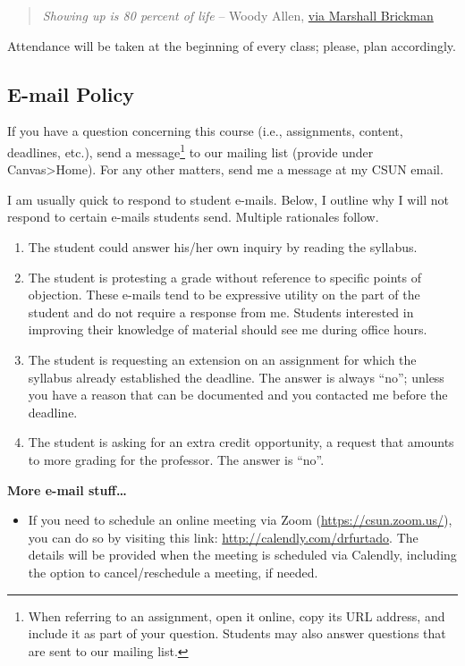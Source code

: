 \documentclass[11pt,]{article}
\providecommand{\tightlist}{%
  \setlength{\itemsep}{0pt}\setlength{\parskip}{0pt}}
\begin{document}
\begin{quote}
\emph{Showing up is 80 percent of life} -- Woody Allen,
\href{http://quoteinvestigator.com/2013/06/10/showing-up/\#note-6553-1}{via
Marshall Brickman}
\end{quote}

Attendance will be taken at the beginning of every class; please, plan
accordingly.

\hypertarget{e-mail-policy}{%
\subsection{E-mail Policy}\label{e-mail-policy}}

If you have a question concerning this course (i.e., assignments,
content, deadlines, etc.), send a message\footnote{When referring to an
  assignment, open it online, copy its URL address, and include it as
  part of your question. Students may also answer questions that are
  sent to our mailing list.} to our mailing list (provide under
Canvas\textgreater Home). For any other matters, send me a message at my
CSUN email.

I am usually quick to respond to student e-mails. Below, I outline why I
will not respond to certain e-mails students send. Multiple rationales
follow.

\begin{enumerate}
\def\labelenumi{\arabic{enumi}.}
\tightlist
\item
  The student could answer his/her own inquiry by reading the syllabus.
\item
  The student is protesting a grade without reference to specific points
  of objection. These e-mails tend to be expressive utility on the part
  of the student and do not require a response from me. Students
  interested in improving their knowledge of material should see me
  during office hours.
\item
  The student is requesting an extension on an assignment for which the
  syllabus already established the deadline. The answer is always
  ``no''; unless you have a reason that can be documented and you
  contacted me before the deadline.
\item
  The student is asking for an extra credit opportunity, a request that
  amounts to more grading for the professor. The answer is ``no''.
\end{enumerate}

\textbf{More e-mail stuff\ldots{}}

\begin{itemize}
\tightlist
\item
  If you need to schedule an online meeting via Zoom
  (\url{https://csun.zoom.us/}), you can do so by visiting this link:
  \url{http://calendly.com/drfurtado}. The details will be provided when
  the meeting is scheduled via Calendly, including the option to
  cancel/reschedule a meeting, if needed.
\end{itemize}
\end{document}
